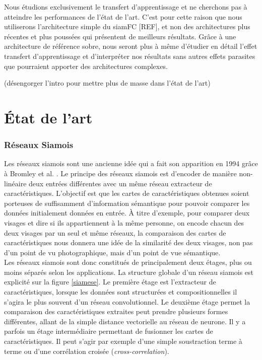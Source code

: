 \documentclass[10pt,twocolumn,letterpaper,french]{article}
\begin{document}
  Nous étudions exclusivement le transfert d'apprentissage et ne cherchons pas à atteindre les performances de l'état de l'art. C'est pour cette raison que nous utiliserons l'architecture simple du siamFC [REF], et non des architectures plus récentes et plus poussées qui présentent de meilleurs résultats. Grâce à une architecture de référence sobre, nous seront plus à même d'étudier en détail l'effet transfert d'apprentissage et d'interpréter nos résultats sans autres effets parasites que pourraient apporter des architectures complexes.
  
(désengorger l'intro pour mettre plus de masse dans l'état de l'art)
   

\section*{État de l'art}

\subsubsection*{Réseaux Siamois}

Les réseaux siamois sont une ancienne idée qui a fait son apparition en 1994 grâce à Bromley et al. \cite{siamese}. Le principe des réseaux siamois est d'encoder de manière non-linéaire deux entrées différentes avec un même réseau extracteur de caractéristiques. L'objectif est que les cartes de caractéristiques obtenues soient porteuses de suffisamment d'information sémantique pour pouvoir comparer les données initialement données en entrée. À titre d'exemple, pour comparer deux visages et dire si ils appartiennent à la même personne, on encode chacun des deux visages par un seul et même réseaux, la comparaison des cartes de caractéristiques nous donnera une idée de la similarité des deux visages, non pas d'un point de vu photographique, mais d'un point de vue sémantique. \\

Les réseaux siamois sont donc constitués de principalement deux étages, plus ou moins séparés selon les applications. La structure globale d'un réseau siamois est explicité sur la figure \ref{siamese}. Le première étage est l'extracteur de caractéristiques, lorsque les données sont structurées et compositionnelles il s'agira le plus souvent d'un réseau convolutionnel. Le deuxième étage permet la comparaison des caractéristiques extraites peut prendre plusieurs formes différentes, allant de la simple distance vectorielle au réseau de neurone. Il y a parfois un étage intermédiaire permettant de fusionner les cartes de caractéristiques. Il peut s'agir par exemple d'une simple soustraction terme à terme ou d'une corrélation croisée (\textit{cross-correlation}).\\
\end{document}
